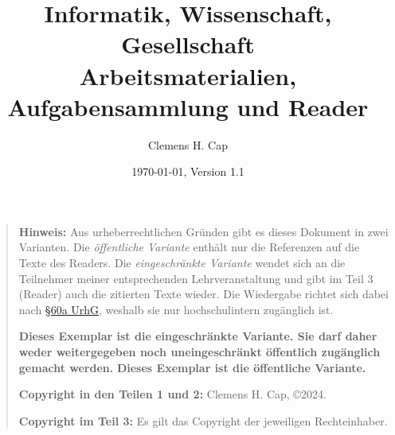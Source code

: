 \documentclass[a4paper]{article}%
\title{Informatik, Wissenschaft, Gesellschaft \\[12pt] \normalsize Arbeitsmaterialien, Aufgabensammlung und Reader}
\author{Clemens H. Cap}
\date{\today, Version 1.1}
\def\mittext{}                 %
\begin{document}
\maketitle

\ifdefined\instruktorflag{}\fi

\begin{quote}

\textbf{Hinweis:} Aus urheberrechtlichen Gründen gibt es dieses Dokument in zwei Varianten.
Die \textit{öffentliche Variante} enthält nur die Referenzen auf die Texte des Readers.
Die \textit{eingeschränkte Variante} wendet sich an die Teilnehmer meiner entsprechenden Lehrveranstaltung
und gibt im Teil 3 (Reader) auch die zitierten Texte wieder.
Die Wiedergabe richtet sich dabei nach \href{https://dejure.org/gesetze/UrhG/60a.html}{\S 60a UrhG}, 
weshalb sie nur hochschulintern zugänglich ist.

\ifdefined\mittext\textbf{Dieses Exemplar ist die eingeschränkte Variante.
Sie darf daher weder weitergegeben noch uneingeschränkt öffentlich
zugänglich gemacht werden.}
\else\textbf{Dieses Exemplar ist die öffentliche Variante.}\fi

\vfill

\textbf{Copyright in den Teilen 1 und 2:}  Clemens H. Cap, \copyright 2024.
\doclicenseThis

\textbf{Copyright im Teil 3:} Es gilt das Copyright der jeweiligen Rechteinhaber.

\vfill




\end{quote}
\end{document}
